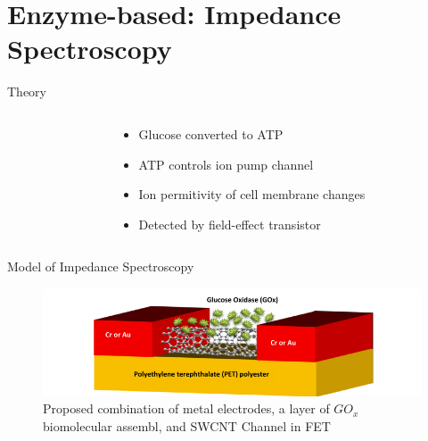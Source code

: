 \documentclass[fontsize=11pt,aspectratio=169,t,fleqn]{beamer}
\begin{document}
\section{Enzyme-based: Impedance Spectroscopy}
\begin{frame}{Theory}
    \begin{columns}[t]
        \begin{column}{.45\textwidth}
        \end{column}
        \begin{column}{.5\textwidth}
          \begin{itemize}
            \item Glucose converted to ATP
            \item ATP controls ion pump channel 
            \item Ion permitivity of cell membrane changes
            \item Detected by field-effect transistor
          \end{itemize}
        \end{column}
    \end{columns}
\end{frame}
\begin{frame}{Model of Impedance Spectroscopy}
    \begin{figure}[h!]
        \includegraphics[width=\textwidth]{fig/SWCNT.png}
        \caption{Proposed combination of metal electrodes, a layer of $GO_x$ biomolecular assembl, and SWCNT Channel in FET}
    \end{figure}
\end{frame}

 
        
\end{document}
